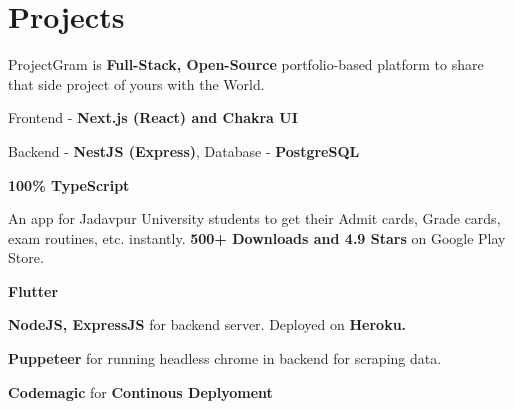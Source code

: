 \documentclass[]{deedy-resume-openfont}
\begin{document}
\begin{minipage}[t]{0.67\textwidth} 





\section{Projects}

ProjectGram is \textbf{Full-Stack, Open-Source} portfolio-based platform to share that side project of yours with the World.
\\
\vspace{\topsep} %
\begin{tightemize}
\item Frontend - \textbf{Next.js (React) and Chakra UI }
\item Backend - \textbf {NestJS (Express)}, Database - \textbf {PostgreSQL}
\item \textbf {100\% TypeScript}
\end{tightemize}
\sectionsep



An app for Jadavpur University students to get their Admit cards, Grade cards, exam routines, etc. instantly. \textbf{500+ Downloads and 4.9 Stars} on Google Play Store.\\
\begin{tightemize}
\item \textbf{Flutter}
\item \textbf{NodeJS, ExpressJS} for backend server. Deployed on \textbf{Heroku.}
\item \textbf{Puppeteer} for running headless chrome in backend for scraping data.
\item \textbf{Codemagic} for \textbf{Continous Deplyoment}
\end{tightemize}
\sectionsep



\end{minipage}
\end{document}
